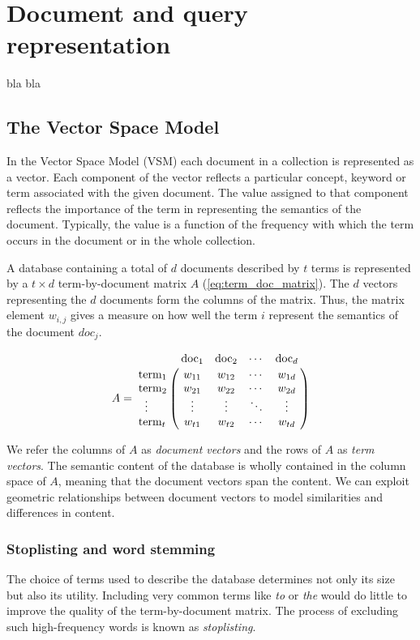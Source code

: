 \chapter{Document and query representation}
bla bla

\section{The Vector Space Model}
In the Vector Space Model (VSM) each document in a collection is represented as a vector. Each component of the vector reflects a particular concept, keyword or term associated with the given document. The value assigned to that component reflects the importance of the term in representing the semantics of the document. Typically, the value is a function of the frequency with which the term occurs in the document or in the whole collection.

A database containing a total of $d$ documents described by $t$ terms is represented by a $t \times d$ term-by-document matrix $A$ (\ref{eq:term_doc_matrix}). The $d$ vectors representing the $d$ documents form the columns of the matrix. Thus, the matrix element $w_{i,j}$ gives a measure on how well the term $i$ represent the semantics of the document $doc_j$. 

\begin{equation}\label{eq:term_doc_matrix}
A = 
\bordermatrix{
  & \mbox{doc}_1   & \mbox{doc}_2      & \cdots & \mbox{doc}_d \cr
\mbox{term}_1      & w_{11} & w_{12} & \cdots & w_{1d} \cr
\mbox{term}_2      & w_{21} & w_{22} & \cdots & w_{2d} \cr
  \; \;     \vdots      & \vdots & \vdots & \ddots & \vdots \cr
\mbox{term}_t      & w_{t1} & w_{t2} & \cdots & w_{td} \cr}
\end{equation}

We refer the columns of $A$ as \emph{document vectors} and the rows of $A$ as \emph{term vectors}. The semantic content of the database is wholly contained in the column space of $A$, meaning that the document vectors span the content. We can exploit geometric relationships between document vectors to model similarities and differences in content.

\subsection{Stoplisting and word stemming}
The choice of terms used to describe the database determines not only its size but also its utility. Including very common terms like \emph{to} or \emph{the} would do little to improve the quality of the term-by-document matrix. The process of excluding such high-frequency words is known as \emph{stoplisting}.

